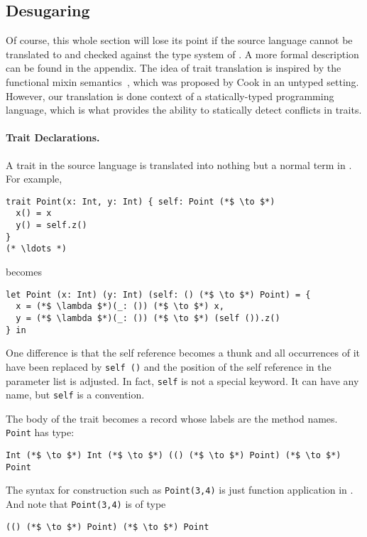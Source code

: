\subsection{Desugaring}

Of course, this whole section will lose its point if the source language cannot
be translated to \name and checked against the type system of \name. A more
formal description can be found in the appendix. The idea of trait translation
is inspired by the functional mixin semantics~\cite{cook1989denotational}, which was
proposed by Cook in an untyped setting. However, our translation is done context of a
statically-typed programming language, which is what provides the ability to statically
detect conflicts in traits.

\paragraph{Trait Declarations.} A trait in the source language is translated into
nothing but a normal term in \name. For example,

\begin{lstlisting}
trait Point(x: Int, y: Int) { self: Point (*$ \to $*)
  x() = x
  y() = self.z()
}
(* \ldots *)
\end{lstlisting}

becomes

\begin{lstlisting}
let Point (x: Int) (y: Int) (self: () (*$ \to $*) Point) = {
  x = (*$ \lambda $*)(_: ()) (*$ \to $*) x,
  y = (*$ \lambda $*)(_: ()) (*$ \to $*) (self ()).z()
} in
\end{lstlisting}

One difference is that the self reference becomes a thunk and all occurrences of
it have been replaced by \lstinline$self ()$ and the position of the self
reference in the parameter list is adjusted. In fact, \lstinline$self$ is not a
special keyword. It can have any name, but \lstinline$self$ is a
convention.

The body of the trait becomes a record whose labels are the method names.
\lstinline$Point$ has type:

\begin{lstlisting}
Int (*$ \to $*) Int (*$ \to $*) (() (*$ \to $*) Point) (*$ \to $*) Point
\end{lstlisting}

The syntax for construction such as \lstinline$Point(3,4)$ is just function
application in \name. And note that \lstinline$Point(3,4)$ is of type
\begin{lstlisting}
(() (*$ \to $*) Point) (*$ \to $*) Point
\end{lstlisting}


